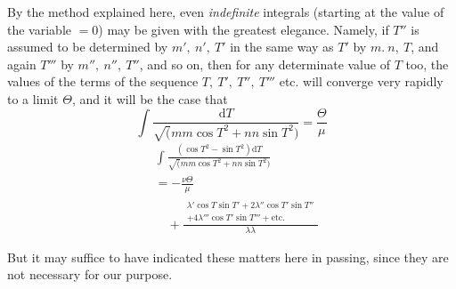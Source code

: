 \begingroup
\renewcommand{\arraystretch}{1.45}
By the method explained here, even \textit{indefinite} integrals (starting at the value of the variable $=0$) may be given with the greatest elegance. Namely, if $T''$ is assumed to be determined by $m',\ n',\ T'$ in the same way as $T'$ by $m.\ n,\ T$, and again $T'''$ by $m'',\ n'',\ T''$, and so on, then for any determinate value of $T$ too, the values of the terms of the sequence $T,\ T',\ T'',\ T'''$ etc. will converge very rapidly to a limit $\Theta$, and it will be the case that
\[
\int\frac{\mathrm{d}T}{\surd(mm\cos T^2+nn\sin T^2)}=\frac{\Theta}{\mu}
\]
\[
\begin{aligned}&\int\frac{(\cos T^2-\sin T^2)\mathrm{d}T}{\surd(mm\cos T^2+nn\sin T^2)}\\[7pt]&=-\frac{\nu\Theta}{\mu}\\[7pt]&\quad+\frac{\begin{gathered}\lambda'\cos T\sin T'+2\lambda''\cos T'\sin T''\\+4\lambda'''\cos T'\sin T'''+\mathrm{etc.}\end{gathered}}{\lambda\lambda}\end{aligned}
\]
\par But it may suffice to have indicated these matters here in passing, since they are not necessary for our purpose.


